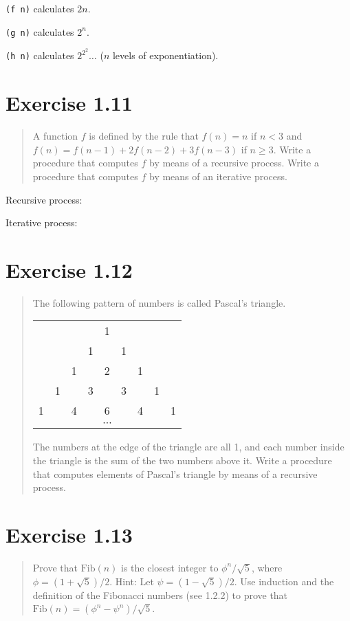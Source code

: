 \documentclass{article}
\begin{document}
\verb|(f n)| calculates $2n$.

\verb|(g n)| calculates $2^n$.

\verb|(h n)| calculates $2^{2^2}\ldots$ ($n$ levels of exponentiation).

\section{Exercise 1.11}
\begin{quote}
    A function $f$ is defined by the rule that $f(n) = n$ if $n < 3$ and
    $f(n) = f(n - 1) + 2f(n - 2) + 3f(n - 3)$ if $n \geq 3$. Write a procedure
    that computes $f$ by means of a recursive process. Write a procedure that
    computes $f$ by means of an iterative process.
\end{quote}

Recursive process:


Iterative process:


\section{Exercise 1.12}
\begin{quote}
	The following pattern of numbers is called Pascal’s triangle.

    \begin{tabular}{ccccccccc}
         & & & &1& & & & \\
         & & &1& &1& & & \\
         & &1& &2& &1& & \\
         &1& &3& &3& &1& \\
        1& &4& &6& &4& &1\\
        \multicolumn{9}{c}{$\cdots$}
    \end{tabular}

	The numbers at the edge of the triangle are all 1, and each number inside
	the triangle is the sum of the two numbers above it. Write a procedure that
	computes elements of Pascal's triangle by means of a recursive process.
\end{quote}

\parbox{\textwidth}{}

\section{Exercise 1.13}
\begin{quote}
	Prove that $\textrm{Fib}(n)$ is the closest integer to $\phi^n/\sqrt{5}$,
	where $\phi = (1+\sqrt{5})/2$.  Hint: Let $\psi = (1-\sqrt{5})/2$. Use
	induction and the definition of the Fibonacci numbers (see 1.2.2) to prove
	that $\textrm{Fib}(n) = (\phi^n -\psi^n)/\sqrt{5}$.
\end{quote}
\end{document}
